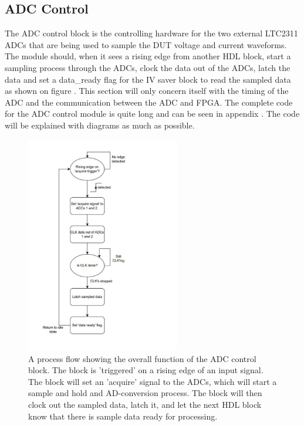 \subsection{ADC Control} \label{subsec:ADC_CONTROL} 

The ADC control block is the controlling hardware for the two external LTC2311\cite{ADC_LTC2311} ADCs that are being used to sample the DUT voltage and current waveforms. The module should, when it sees a rising edge from another HDL block, start a sampling process through the ADCs, clock the data out of the ADCs, latch the data and set a data\_ready flag for the IV saver block to read the sampled data as shown on figure . This section will only concern itself with the timing of the ADC and the communication between the ADC and FPGA. The complete code for the ADC control module is quite long and can be seen in appendix . The code will be explained with diagrams as much as possible.

\begin{figure}[H]
    \centering
    \includegraphics[clip, trim=0 0 0 0, width=0.6\textwidth]{Sections/7_SystemDesign/Figures/7_2_8_ADCControlOverallSignals_cropped.pdf}
    \caption{A process flow showing the overall function of the ADC control block. The block is 'triggered' on a rising edge of an input signal. The block will set an 'acquire' signal to the ADCs, which will start a sample and hold and AD-conversion process. The block will then clock out the sampled data, latch it, and let the next HDL block know that there is sample data ready for processing.}
    \label{fig:7_2_8_ADCControlProcess}
\end{figure}

